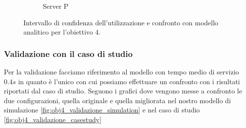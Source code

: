 \begin{figure}
\begin{subfigure}{0.5\linewidth}
        \caption{Server P}
        \label{fig:obj4_line_utilization_P}
    \end{subfigure}
    \caption{Intervallo di confidenza dell'utilizzazione e confronto con modello analitico per l'obiettivo 4.}
    \label{fig:obj4_lineplots_utilization}
\end{figure}

\subsubsection{Validazione con il caso di studio}
\label{sec:results-obj4-validation}
Per la validazione facciamo riferimento al modello con tempo medio di servizio 0.4$s$ in quanto è l'unico con cui possiamo effettuare un confronto con i risultati riportati dal caso di studio. Seguono i grafici dove vengono messe a confronto le due configurazioni, quella originale e quella migliorata nel nostro modello di simulazione \autoref{fig:obj4_validazione_simulation} e nel caso di studio \autoref{fig:obj4_validazione_casestudy}
